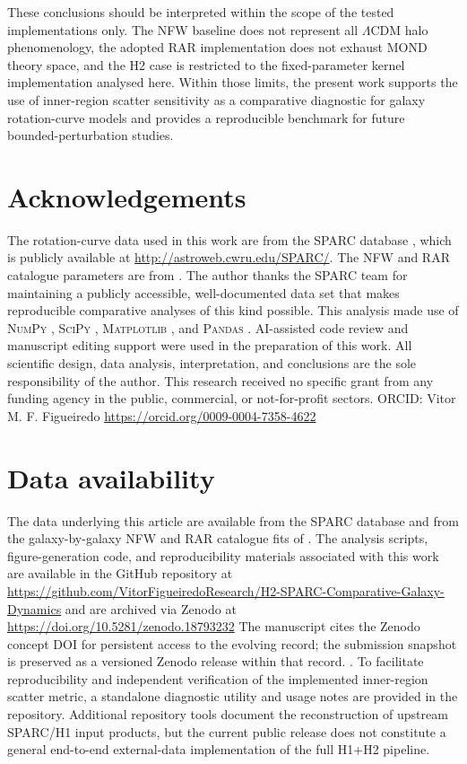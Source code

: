 \documentclass[fleqn,usenatbib]{mnras}
\begin{document}
These conclusions should be interpreted within the scope of the tested implementations only. The NFW baseline does not represent all $\Lambda$CDM halo phenomenology, the adopted RAR implementation does not exhaust MOND theory space, and the H2 case is restricted to the fixed-parameter kernel implementation analysed here. Within those limits, the present work supports the use of inner-region scatter sensitivity as a comparative diagnostic for galaxy rotation-curve models and provides a reproducible benchmark for future bounded-perturbation studies.


\section*{Acknowledgements}
The rotation-curve data used in this work are from the SPARC database
\citep{Lelli2016}, which is publicly available at
\url{http://astroweb.cwru.edu/SPARC/}. The NFW and RAR catalogue
parameters are from \citet{Li2020}. The author thanks the SPARC team
for maintaining a publicly accessible, well-documented data set that
makes reproducible comparative analyses of this kind possible. This
analysis made use of \textsc{NumPy} \citep{numpy2020},
\textsc{SciPy} \citep{scipy2020}, \textsc{Matplotlib}
\citep{matplotlib2007}, and \textsc{Pandas} \citep{pandas2010}.
AI-assisted code review and manuscript editing support were used in the
preparation of this work. All scientific design, data analysis,
interpretation, and conclusions are the sole responsibility of the
author. This research received no specific grant from any funding
agency in the public, commercial, or not-for-profit sectors.
ORCID: Vitor M. F. Figueiredo \url{https://orcid.org/0009-0004-7358-4622}
\section*{Data availability}
The data underlying this article are available from the SPARC database
\citep{Lelli2016} and from the galaxy-by-galaxy NFW and RAR catalogue
fits of \citet{Li2020}. The analysis scripts, figure-generation code,
and reproducibility materials associated with this work are available in
the GitHub repository at
\url{https://github.com/VitorFigueiredoResearch/H2-SPARC-Comparative-Galaxy-Dynamics}
and are archived via Zenodo at
\url{https://doi.org/10.5281/zenodo.18793232}
The manuscript cites the Zenodo concept DOI for persistent access to the evolving record; the submission snapshot is preserved as a versioned Zenodo release within that record.
\citep{FigueiredoH2zenodo2026}.
To facilitate reproducibility and independent verification of the
implemented inner-region scatter metric, a standalone diagnostic utility
and usage notes are provided in the repository. Additional repository
tools document the reconstruction of upstream SPARC/H1 input products,
but the current public release does not constitute a general end-to-end
external-data implementation of the full H1+H2 pipeline.	
	
	
	
\end{document}
